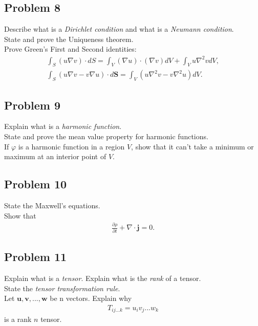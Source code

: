 \documentclass[a4paper]{article}
\begin{document}
\subsection{Problem 8}
Describe what is a \emph{Dirichlet condition} and what is a \emph{Neumann condition}.\\
State and prove the Uniqueness theorem.\\
Prove Green's First and Second identities:
\begin{equation*}
\begin{aligned}
\int_S \left(u\nabla v\right) \cdot dS = \int_V \left(\nabla u\right) \cdot\left(\nabla v\right) dV + \int_V u\nabla^2 v dV,\\
\int_S \left(u\nabla v - v\nabla u\right) \cdot d\mathbf{S} = \int_V \left(u\nabla^2 v - v\nabla^2 u \right) dV.
\end{aligned}
\end{equation*}

\subsection{Problem 9}
Explain what is a \emph{harmonic function}.\\
State and prove the mean value property for harmonic functions.\\
If $\varphi$ is a harmonic function in a region $V$, show that it can't take a minimum or maximum at an interior point of $V$.

\subsection{Problem 10}
State the Maxwell's equations.\\
Show that
\begin{equation*}
\begin{aligned}
\frac{\partial \rho}{\partial t}+ \nabla \cdot \mathbf{j} = 0.
\end{aligned}
\end{equation*}

\subsection{Problem 11}
Explain what is a \emph{tensor}. Explain what is the \emph{rank} of a tensor.\\
State the \emph{tensor transformation rule}.\\
Let $\mathbf{u},\mathbf{v},...,\mathbf{w}$ be n vectors. Explain why
\begin{equation*}
\begin{aligned}
T_{ij...k} = u_i v_j ... w_k
\end{aligned}
\end{equation*}
is a rank $n$ tensor.
\end{document}
